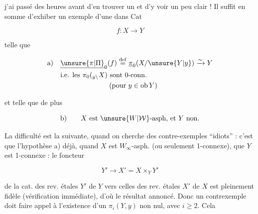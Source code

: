 
j'ai passé des heures avant d'en trouver un et d'y voir un peu clair ! Il suffit en somme d'exhiber un exemple d'une  dans $\mathrm{Cat}$

\[
 f:X\longrightarrow Y
\]

telle que

\[
\begin{aligned}
\text{a)}\quad &\underline{\unsure{\pi|\Pi}}_0(f)\overset{\mathrm{def}}{=}\underline{\pi}_0(X/\unsure{Y|y})\xrightarrow{\sim}Y\\
&\text{i.e. les }\pi_0({}_{y\backslash}X)\text{ sont 0-conn.}\\
&\hspace{7em}(\text{pour }y\in\mathrm{ob}\, Y)
\end{aligned}
\]

et telle que de plus

\[
\text{b)}\qquad X\text{ est }\unsure{W|\mathcal W}\text{-asph, et }Y\text{ non.}
\]

\noindent\makebox[0pt][r]{\rule[-4.8\baselineskip]{0.4pt}{5.6\baselineskip}\hspace{.65em}}%
La difficulté est la suivante, quand on cherche des contre-exemples ``idiots'' : c'est que l'hypothèse a)  déjà, quand $X$ est $W_\infty$-asph. (ou seulement 1-connexe), que $Y$ est 1-connexe : le foncteur

\[
Y'\longrightarrow X'=X\times_Y Y'
\]

de la cat. des rev. étales $Y'$ de $Y$ vers celles des rev. étales $X'$ de $X$ est pleinement fidèle (vérification immédiate), d'où le résultat annoncé. Donc un contrexemple doit faire appel à l'existence d'un $\pi_i(Y,y)$ non nul, avec $i\geq2$. Cela 
